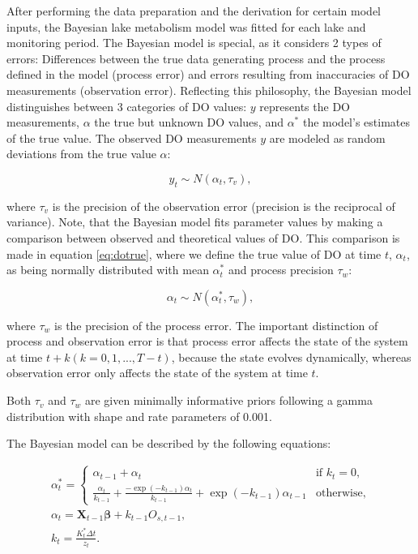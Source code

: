 \documentclass[11pt,lineno]{manuscript}\usepackage[]{graphicx}\usepackage[]{xcolor}
\begin{document}
After performing the data preparation and the derivation for certain model
inputs, the Bayesian lake metabolism model was fitted for each lake and
monitoring period. The Bayesian model is special, as it considers 2 types
of errors: Differences between the true data generating process and the process
defined in the model (process error) and errors resulting from inaccuracies
of DO measurements (observation error). Reflecting this philosophy, the
Bayesian model distinguishes between 3 categories of DO values: $y$ represents
the DO measurements, $\alpha$ the true but unknown DO values, and
$\alpha^{\ast}$ the model's estimates of the true value.
The observed DO measurements $y$ are modeled as random deviations from the true
value $\alpha$:

\begin{equation}
y_{t} \sim N(\alpha_{t}, \tau_{v}),
\label{eq:doobs}
\end{equation}

where $\tau_{v}$ is the precision of the observation error (precision is
the reciprocal of variance).
Note, that the Bayesian model fits parameter values by making a comparison
between observed and theoretical values of DO.
This comparison is made in equation \ref{eq:dotrue}, where we define the true value of 
DO at time $t$, $\alpha_{t}$, as being normally distributed with mean 
$\alpha^{\ast}_{t}$ and process precision $\tau_{w}$:

\begin{equation}
\alpha_{t} \sim N(\alpha^{\ast}_{t}, \tau_{w}),
\label{eq:dotrue}
\end{equation}

where $\tau_{w}$ is the precision of the process error.
The important distinction of process and observation error is that
process error affects the state of the system at time
$t + k (k=0, 1, ..., T-t)$, because the state evolves dynamically, whereas
observation error only affects the state of the system at time $t$.

Both $\tau_{v}$ and $\tau_{w}$ are given minimally informative priors
following a gamma distribution with shape and rate parameters of 0.001.

The Bayesian model can be described by the following equations:

\begin{gather}
\alpha^{\ast}_{t} =
\begin{cases}
\alpha_{t-1} + \alpha_{t} & \text{if } k_{t} = 0, \\
\frac{\alpha_{t}}{k_{t-1}} + \frac{-\exp{(-k_{t-1})}\alpha_{t}}{k_{t-1}} +
\exp{(-k_{t-1})}\alpha_{t-1} & \text{otherwise},
\end{cases} \label{eq:sys1} \\
\alpha_{t} = \mathbf{X}_{t-1}\bm{\beta} + k_{t-1}O_{s,t-1}, \label{eq:sys2} \\
k_{t} = \frac{K^{\ast}_{t}\Delta t}{z_{t}}. \label{eq:sys3}
\end{gather}
\end{document}
